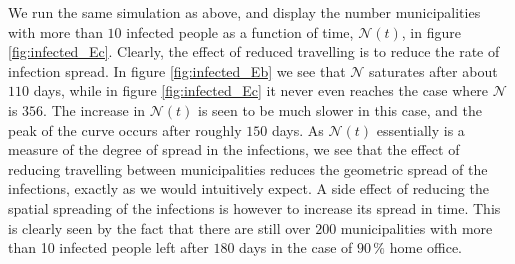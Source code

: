 We run the same simulation as above, and display the number municipalities with more than $10$ infected people as a function of time, $\mathcal{N}(t)$,  in figure \ref{fig:infected_Ec}. Clearly, the effect of reduced travelling is to reduce the rate of infection spread. In figure \ref{fig:infected_Eb} we see that $\mathcal{N}$ saturates after about $110$ days, while in figure \ref{fig:infected_Ec} it never even reaches the case where $\mathcal{N}$ is $356$. The increase in $\mathcal{N}(t)$ is seen to be much slower in this case, and the peak of the curve occurs after roughly $150$ days. As $\mathcal{N}(t)$ essentially is a measure of the degree of spread in the infections, we see that the effect of reducing travelling between municipalities reduces the geometric spread of the infections, exactly as we would intuitively expect. A side effect of reducing the spatial spreading of the infections is however to increase its spread in time. This is clearly seen by the fact that there are still over $200$ municipalities with more than 10 infected people left after $180$ days in the case of $90 \, \%$ home office. 

